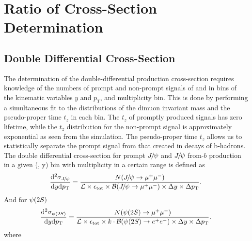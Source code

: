 \section{Ratio of Cross-Section Determination}
\label{Ratio of Cross-Section Determination}
\def\effTot{\ensuremath{\epsilon_{\mathrm{tot}}}\xspace}
\def\effTotJ{\ensuremath{\epsilon_{\mathrm{tot,\jpsi}}}\xspace}
\def\effTotP{\ensuremath{\epsilon_{\mathrm{tot,\psitwos}}}\xspace}
\subsection{Double Differential Cross-Section}
The determination of the double-differential production cross-section requires knowledge 
of the numbers of prompt and non-prompt signals of \jpsi and \psitwos in bins of the 
kinematic variables $y$ and $p_T$, and multiplicity bin. This is done by 
performing a simultaneous fit to the distributions of the dimuon invariant mass and the 
pseudo-proper time $t_z$ in each bin. The $t_z$ of promptly produced signals has 
zero lifetime, while the $t_z$ distribution for the non-prompt signal is 
approximately exponential as seen from the simulation. The pseudo-proper time $t_z$ allows us 
to statistically separate the prompt signal from that created in decays of b-hadrons.
The double differential cross-section for prompt ${{J\mskip -3mu/\mskip -2mu\psi}}$ and ${{J\mskip -3mu/\mskip -2mu\psi}}$ from-$b$ production in a given (\pt, y) 
bin with multiplicity in a certain range is defined as
\begin{equation}
    \frac{\deriv^2\sigma_{\jpsi}}{\deriv y\deriv \pt} 
    = \frac{N(\jpsi\rightarrow\mu^+\mu^-)}
           {\mathcal{L}\times\effTot\times \BR(\jpsi\rightarrow\mu^+\mu^-)\times\Delta y \times \Delta \pt}. 
  \label{CrossSecJ}
\end{equation}
And for ${\psi{(2S)}}$
\begin{equation}
    \frac{\deriv^2\sigma_{\psitwos}}{\deriv y\deriv \pt} 
    = \frac{N(\psitwos\rightarrow\mu^+\mu^-)}
           {\mathcal{L}\times\effTot\times k\cdot \BR(\psitwos\rightarrow e^+ e^-)\times\Delta y \times \Delta \pt}. 
  \label{CrossSecP}
\end{equation}  
where
